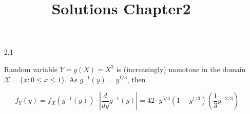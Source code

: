 \documentclass[a4paper]{article}
\begin{document}
\title{Solutions Chapter2 }
\begin{itemize}
    \item[2.1]

    \subitem[a] Random variable $Y =g(X)= X^3$ is (increasingly)  monotone in
    the domain $\mathcal{X}=\{x:0\leq x \leq 1\}$.
    As $g^{-1}(y)=y^{1/3}$, then

    $$f_Y(y) = f_X(g^{-1}(y))\cdot\left|\frac{d }{dy} g^{-1}(y)\right|=42 \cdot y^{5/3}(1-y^{1/3})(\frac{1}{3}y^{-2/3}) $$

\end{itemize}
\end{document}

